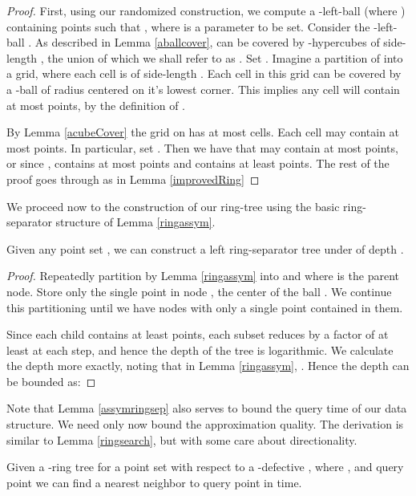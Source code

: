 \documentclass[11pt]{myclass}
\begin{document}
\begin{proof}
First, using our randomized construction, we compute a -left-ball  (where ) containing  
points such that , where  is a parameter to be set. 
Consider the -left-ball .  As described in Lemma \ref{aballcover},  can be covered by  
-hypercubes of side-length ,
 the union of which we shall refer to as . Set . 
 Imagine a partition of  into a grid, where each cell is of side-length . 
Each cell in this grid can be covered by a -ball of radius 
centered on it's lowest corner.  This implies any cell will contain at most  points, 
by the definition of . 

 By Lemma \ref{acubeCover} the grid on  has at most  cells.
 Each cell may contain at most  points. In particular, set . Then we have that  may contain 
at most  points,  or since ,  contains at most  points 
and  contains at least  points.  The rest of the proof goes through as in Lemma \ref{improvedRing}
\end{proof}


We proceed now to the construction of our ring-tree using the basic ring-separator structure of Lemma \ref{ringassym}.

\begin{lemma}\label{assymringsep}
Given any point set , we can construct a  
left ring-separator tree  under  of depth  .
\end{lemma}

\begin{proof}
Repeatedly partition  by Lemma \ref{ringassym} into  and  where  is the parent node. Store only the single point  in node , the center of the ball . We continue this partitioning until we have nodes with only a single point contained in them.

Since each child contains at least  points, each subset reduces by a factor of at least  at each step, 
and hence the depth of the tree is logarithmic. 
We calculate the depth more exactly, noting that in Lemma \ref{ringassym}, .
Hence the depth  can be bounded as:

\end{proof}

Note that Lemma \ref{assymringsep} also serves to bound the query time of our data structure. We need only now bound the approximation quality.
The derivation is similar to Lemma \ref{ringsearch}, but with some care about directionality. 


\begin{lemma}\label{ringsearchassym}
Given a -ring tree  for a point set with respect to a -defective  , where , and query point  we can find a  nearest neighbor  to query point  in  time.
\end{lemma}
\end{document}
